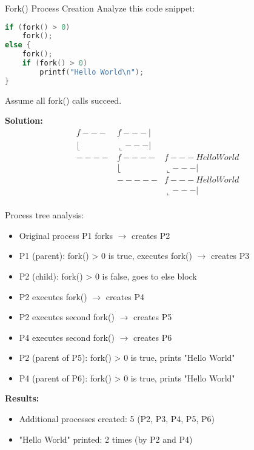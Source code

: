 \begin{example2}{Fork() Process Creation}
    Analyze this code snippet:
    
\begin{lstlisting}[language=C, style=basesmol]
if (fork() > 0)
    fork();
else {
    fork();
    if (fork() > 0)
        printf("Hello World\n");
}
\end{lstlisting}

    Assume all fork() calls succeed.
    
    \tcblower
    
    \textbf{Solution:}
    $$
    \begin{array}{lll}
        f--- & f---| & \\
        \lfloor     & \llcorner ---| & \\
        ---- & f---- & f--- Hello World \\
             & \lfloor      & \llcorner ---| \\
             & ----- & f--- Hello World \\
             &       & \llcorner ---|\\
    \end{array} 
    $$   
    
    Process tree analysis:
    \begin{itemize}
        \item Original process P1 forks $\rightarrow$ creates P2
        \item P1 (parent): fork() > 0 is true, executes fork() $\rightarrow$ creates P3
        \item P2 (child): fork() > 0 is false, goes to else block
        \item P2 executes fork() $\rightarrow$ creates P4
        \item P2 executes second fork() $\rightarrow$ creates P5 
        \item P4 executes second fork() $\rightarrow$ creates P6
        \item P2 (parent of P5): fork() > 0 is true, prints "Hello World"
        \item P4 (parent of P6): fork() > 0 is true, prints "Hello World"
    \end{itemize}
    
    \textbf{Results:}
    \begin{itemize}
        \item Additional processes created: 5 (P2, P3, P4, P5, P6)
        \item "Hello World" printed: 2 times (by P2 and P4)
    \end{itemize}
\end{example2}

